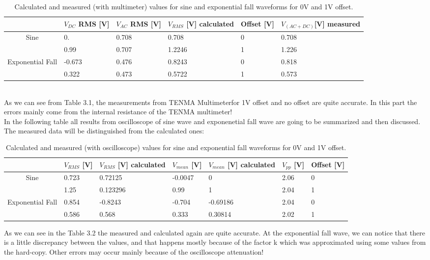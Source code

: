 \documentclass[12pt]{report}
\begin{document}
\begin{table}[h]
\centering
\begin{tabular}{|c|p{1.6cm}|p{1.6cm}|p{2cm}|p{1.6cm}|p{2cm}|}
\hline
\rowcolor{lightblue}\multirow{2}{*}{Waveform} & $V_{DC}$ RMS [V] & $V_{AC}$ RMS [V] & $V_{RMS}$ [V] calculated & Offset [V] & $V_{(AC+DC)}$[V] measured \\
\hline 
\multirow{2}{*}{Sine} & 0. & 0.708 & 0.708 & 0 & 0.708 \\
& 0.99 & 0.707 & 1.2246 & 1 & 1.226 \\
\hline
\multirow{2}{*}{Exponential Fall} & -0.673 & 0.476 & 0.8243 & 0 & 0.818 \\
& 0.322 & 0.473 & 0.5722 & 1 & 0.573\\
\hline
\end{tabular}
\caption{Calculated and measured (with multimeter) values for sine and exponential fall waveforms for 0V and 1V offset.}
\label{tab:my_table}
\end{table}\\
As we can see from Table 3.1, the measurements from TENMA Multimeterfor 1V offset and no offset are quite accurate. In this part the errors mainly come from the internal resistance of the TENMA multimeter! \\

In the following table all results from oscilloscope of sine wave and exponenetial fall wave are going to be summarized and then discussed. The measured data will be distinguished from the calculated ones: \\ 

\begin{table}[ht]
\centering
\begin{tabular}{|c|p{1.6cm}|p{1.9cm}|p{1.6cm}|p{1.9cm}|p{1cm}|p{1.2cm}|}
\hline
\rowcolor{lightblue} \multirow{2}{*}{Waveform} & $V_{RMS}$ [V] & $V_{RMS}$ [V] calculated & $V_{mean}$ [V] & $V_{mean}$ [V] calculated & $V_{pp}$  [V] & Offset [V] \\
\hline
\multirow{2}{*}{Sine} & 0.723 & 0.72125 & -0.0047 & 0 & 2.06 & 0 \\
& 1.25 & 0.123296 & 0.99 & 1 & 2.04 & 1\\
\hline
\multirow{2}{*}{Exponential Fall} & 0.854 & -0.8243 & -0.704 & -0.69186 & 2.04 & 0 \\
& 0.586 & 0.568 & 0.333 & 0.30814 & 2.02 & 1\\
\hline
\end{tabular} 
\caption{Calculated and measured (with oscilloscope) values for sine and exponential fall waveforms for 0V and 1V offset.}
\label{tab:my_table}
\end{table}
\newpage 
As we can see in the Table 3.2 the measured and calculated again are quite accurate. At the exponential fall wave, we can notice that there is a little discrepancy between the values, and that happens mostly because of the  factor k which was approximated using some values from the hard-copy. Other errors may occur mainly because of the oscilloscope attenuation!
\end{document}

